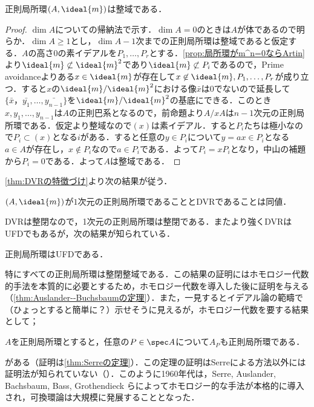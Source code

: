 \begin{thm}\label{thm:正則局所環は整域}
	正則局所環$(A,\ideal{m})$は整域である．
\end{thm}

\begin{proof}
	$\dim A$についての帰納法で示す．$\dim A=0$のときは$A$が体であるので明らか．$\dim A\geq 1$とし，$\dim A-1$次までの正則局所環は整域であると仮定する．$A$の高さ$0$の素イデアルを$P_1,\dots,P_r$とする．\ref{prop:局所環がm^n=0ならArtin}より$\ideal{m}\not\subset\ideal{m}^2$であり$\ideal{m}\not\subset P_i$であるので，Prime avoidanceよりある$x\in\ideal{m}$が存在して$x\not\in\ideal{m},P_1,\dots,P_r$が成り立つ．すると$x$の$\ideal{m}/\ideal{m}^2$における像$\bar{x}$は$0$でないので延長して$\{\bar{x}，\bar{y_1},\dots,\bar{y_{n-1}}\}$を$\ideal{m}/\ideal{m}^2$の基底にできる．このとき$x,y_1,\dots,y_{n-1}$は$A$の正則巴系となるので，前命題より$A/xA$は$n-1$次元の正則局所環である．仮定より整域なので$(x)$は素イデアル．すると$P_i$たちは極小なので$P_i\subset(x)$となる$i$がある．すると任意の$y\in P_i$について$y=ax\in P_i$となる$a\in A$が存在し，$x\not\in P_i$なので$a\in P_i$である．よって$P_i=xP_i$となり，中山の補題から$P_i=0$である．よって$A$は整域である．
\end{proof}

\ref{thm:DVRの特徴づけ}より次の結果が従う．

\begin{cor}
	$(A,\ideal{m})$が$1$次元の正則局所環であることとDVRであることは同値．
\end{cor}

DVRは整閉なので，1次元の正則局所環は整閉である．またより強くDVRはUFDでもあるが，次の結果が知られている．

\begin{thm}\label{prethm:Auslander-Buchsbaum}
	正則局所環はUFDである．
\end{thm}

特にすべての正則局所環は整閉整域である．この結果の証明にはホモロジー代数的手法を本質的に必要とするため，ホモロジー代数を導入した後に証明を与える（\ref{thm:Auslander--Buchsbaumの定理}）．また，一見するとイデアル論の範疇で（ひょっとすると簡単に？）示せそうに見えるが，ホモロジー代数を要する結果として；

\begin{thm}[Serreの定理]\label{prethm:Serre}
	$A$を正則局所環とすると，任意の$P\in\spec A$について$A_P$も正則局所環である．
\end{thm}
がある（証明は\ref{thm:Serreの定理}）．この定理の証明はSerreによる方法以外には証明法が知られていない（\cite{goto}）．このように1960年代は，Serre, Auslander, Bachsbaum, Bass, Grothendieck らによってホモロジー的な手法が本格的に導入され，可換環論は大規模に発展することとなった．

